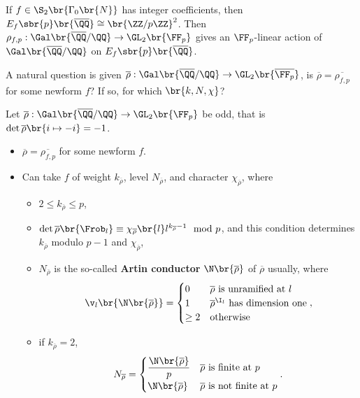 \begin{example*}
If $ f \in \S_2\br{\Gamma_0\br{N}} $ has integer coefficients, then $ E_f\sbr{p}\br{\overline{\QQ}} \cong \br{\ZZ / p\ZZ}^2 $. Then $ \rho_{f, p} : \Gal\br{\overline{\QQ} / \QQ} \to \GL_2\br{\FF_p} $ gives an $ \FF_p $-linear action of $ \Gal\br{\overline{\QQ} / \QQ} $ on $ E_f\sbr{p}\br{\overline{\QQ}} $.
\end{example*}

A natural question is given $ \overline{\rho} : \Gal\br{\overline{\QQ} / \QQ} \to \GL_2\br{\overline{\FF_p}} $, is $ \overline{\rho} = \overline{\rho_{f, p}} $ for some newform $ f $? If so, for which $ \br{k, N, \chi} $?

\begin{theorem}
Let $ \overline{\rho} : \Gal\br{\overline{\QQ} / \QQ} \to \GL_2\br{\FF_p} $ be odd, that is $ \det \overline{\rho}\br{i \mapsto -i} = -1 $.
\begin{itemize}
\item $ \overline{\rho} = \overline{\rho_{f, p}} $ for some newform $ f $.
\item Can take $ f $ of weight $ k_{\overline{\rho}} $, level $ N_{\overline{\rho}} $, and character $ \chi_{\overline{\rho}} $, where
\begin{itemize}
\item $ 2 \le k_{\overline{\rho}} \le p $,
\item $ \det \overline{\rho}\br{\Frob_l} \equiv \chi_{\overline{\rho}}\br{l}l^{k_{\overline{\rho}} - 1} \mod p $, and this condition determines $ k_{\overline{\rho}} $ modulo $ p - 1 $ and $ \chi_{\overline{\rho}} $,
\item $ N_{\overline{\rho}} $ is the so-called \textbf{Artin conductor} $ \N\br{\overline{\rho}} $ of $ \overline{\rho} $ usually, where
$$ \v_l\br{\N\br{\overline{\rho}}} =
\begin{cases}
0 & \overline{\rho} \ \text{is unramified at} \ l \\
1 & \overline{\rho}^{\I_l} \ \text{has dimension one} \\
\ge 2 & \text{otherwise}
\end{cases},
$$
\item if $ k_{\overline{\rho}} = 2 $,
$$ N_{\overline{\rho}} =
\begin{cases}
\dfrac{\N\br{\overline{\rho}}}{p} & \overline{\rho} \ \text{is finite at} \ p \\
\N\br{\overline{\rho}} & \overline{\rho} \ \text{is not finite at} \ p
\end{cases}.
$$
\end{itemize}
\end{itemize}
\end{theorem}

